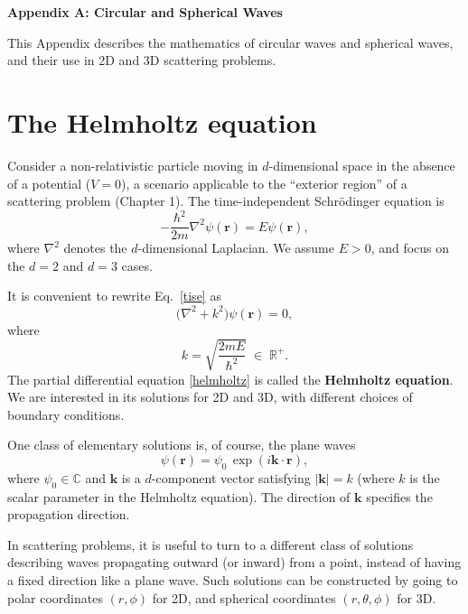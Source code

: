 \documentclass[pra,12pt]{revtex4}
\begin{document}
\begin{center}
{\large \textbf{Appendix A: Circular and Spherical Waves}}
\end{center}

This Appendix describes the mathematics of circular waves and
spherical waves, and their use in 2D and 3D scattering problems.

\section{The Helmholtz equation}

Consider a non-relativistic particle moving in $d$-dimensional space
in the absence of a potential ($V = 0$), a scenario applicable to the
``exterior region'' of a scattering problem (Chapter 1).  The
time-independent Schr\"odinger equation is
\begin{equation}
  -\frac{\hbar^2}{2m}\nabla^2 \psi(\mathbf{r}) = E \psi(\mathbf{r}),
  \label{tise}
\end{equation}
where $\nabla^2$ denotes the $d$-dimensional Laplacian.  We assume $E
> 0$, and focus on the $d = 2$ and $d = 3$ cases.

It is convenient to rewrite Eq.~\eqref{tise} as
\begin{equation}
  \Big(\nabla^2 + k^2\Big) \psi(\mathbf{r}) = 0,
  \label{helmholtz}
\end{equation}
where
\begin{equation}
  k = \sqrt{\frac{2mE}{\hbar^2}} \;\in\; \mathbb{R}^+.
\end{equation}
The partial differential equation \eqref{helmholtz} is called the
\textbf{Helmholtz equation}.  We are interested in its solutions for
2D and 3D, with different choices of boundary conditions.

One class of elementary solutions is, of course, the plane waves
\begin{equation}
  \psi(\mathbf{r}) = \psi_0 \, \exp\left(i\mathbf{k}\cdot\mathbf{r}\right),
  \label{planewaves}
\end{equation}
where $\psi_0 \in \mathbb{C}$ and $\mathbf{k}$ is a $d$-component
vector satisfying $|\mathbf{k}| = k$ (where $k$ is the scalar
parameter in the Helmholtz equation).  The direction of $\mathbf{k}$
specifies the propagation direction.

In scattering problems, it is useful to turn to a different class of
solutions describing waves propagating outward (or inward) from a
point, instead of having a fixed direction like a plane wave.  Such
solutions can be constructed by going to polar coordinates $(r, \phi)$
for 2D, and spherical coordinates $(r,\theta,\phi)$ for 3D.
\end{document}
